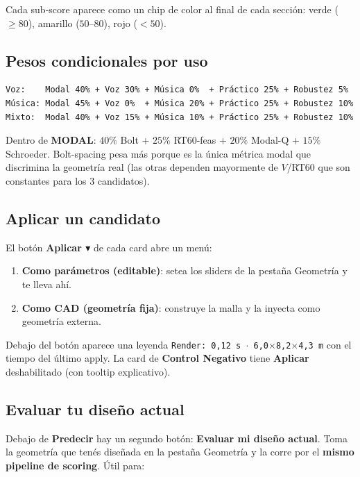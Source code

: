 \documentclass[11pt, a4paper]{article}
\newcommand{\menu}[1]{\textbf{\guillemotleft #1\guillemotright}}
\begin{document}
Cada sub-score aparece como un chip de color al final de cada sección:
\textcolor{cGreen}{verde} ($\geq 80$), \textcolor{cOrange}{amarillo}
($50$--$80$), rojo ($< 50$).

\subsection{Pesos condicionales por uso}

\begin{verbatim}
Voz:    Modal 40% + Voz 30% + Música 0%  + Práctico 25% + Robustez 5%
Música: Modal 45% + Voz 0%  + Música 20% + Práctico 25% + Robustez 10%
Mixto:  Modal 40% + Voz 15% + Música 10% + Práctico 25% + Robustez 10%
\end{verbatim}

Dentro de \textbf{MODAL}: $40\%$ Bolt + $25\%$ RT60-feas + $20\%$ Modal-Q
+ $15\%$ Schroeder. Bolt-spacing pesa más porque es la única métrica
modal que discrimina la geometría real (las otras dependen mayormente
de $V$/RT60 que son constantes para los 3 candidatos).

\subsection{Aplicar un candidato}

El botón \menu{Aplicar $\blacktriangledown$} de cada card abre un menú:

\begin{enumerate}
  \item \textbf{Como parámetros (editable)}: setea los sliders de la
        pestaña Geometría y te lleva ahí.
  \item \textbf{Como CAD (geometría fija)}: construye la malla y la
        inyecta como geometría externa.
\end{enumerate}

Debajo del botón aparece una leyenda
\texttt{Render: 0,12 s $\cdot$ 6,0$\times$8,2$\times$4,3 m} con el
tiempo del último apply. La card de \textbf{Control Negativo} tiene
\menu{Aplicar} deshabilitado (con tooltip explicativo).

\subsection{Evaluar tu diseño actual}

Debajo de \menu{Predecir} hay un segundo botón:
\menu{Evaluar mi diseño actual}. Toma la geometría que tenés diseñada
en la pestaña Geometría y la corre por el \textbf{mismo pipeline de
scoring}. Útil para:
\end{document}
